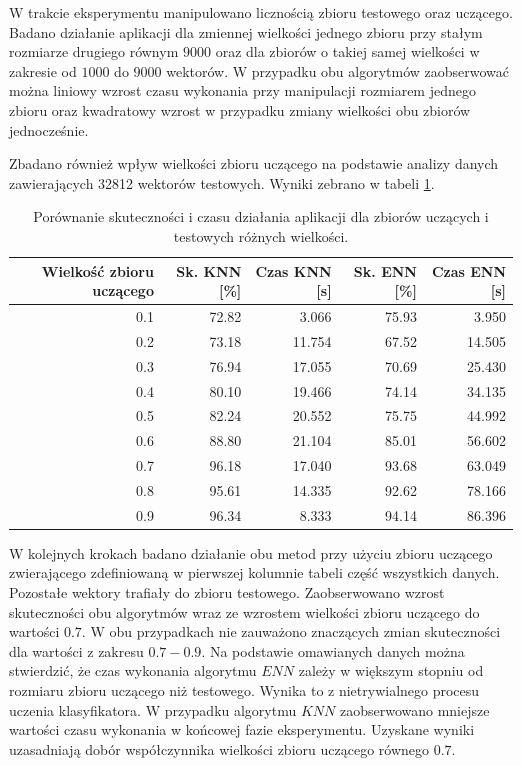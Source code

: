 W trakcie eksperymentu manipulowano licznością zbioru testowego oraz uczącego. Badano działanie aplikacji dla zmiennej wielkości jednego zbioru przy stałym rozmiarze drugiego równym $9000$ oraz dla zbiorów o takiej samej wielkości w zakresie od $1000$ do $9000$ wektorów. W przypadku obu algorytmów zaobserwować można liniowy wzrost czasu wykonania przy manipulacji rozmiarem jednego zbioru oraz kwadratowy wzrost w przypadku zmiany wielkości obu zbiorów jednocześnie.

Zbadano również wpływ wielkości zbioru uczącego na podstawie analizy danych zawierających 32812 wektorów testowych. Wyniki zebrano w tabeli \ref{tab:rozmiar-zbioru-uczacego}.

\begin{table}[H]
	\centering
	\begin{tabular}{|r|r|r|r|r|}
		\hline
		Wielkość zbioru uczącego & Sk. KNN [\%] & Czas KNN [s] & Sk. ENN [\%] & Czas ENN [s]  \\ 
		\hline
		0.1 & 72.82 & 3.066 & 75.93 & 3.950\\
		\hline
		0.2 & 73.18 & 11.754 & 67.52 & 14.505 \\
		\hline
		0.3 & 76.94 & 17.055 & 70.69 & 25.430 \\
		\hline
		0.4 & 80.10 & 19.466 & 74.14 & 34.135 \\
		\hline
		0.5 & 82.24 & 20.552 & 75.75 &  44.992\\
		\hline
		0.6 & 88.80 & 21.104 & 85.01 & 56.602 \\
		\hline
		0.7 & 96.18 & 17.040 & 93.68 & 63.049 \\
		\hline
		0.8 & 95.61 & 14.335 & 92.62 & 78.166 \\
		\hline
		0.9 & 96.34 & 8.333 & 94.14 & 86.396 \\
		\hline
	\end{tabular}
	\caption{Porównanie skuteczności i czasu działania aplikacji dla zbiorów uczących i testowych różnych wielkości.}
	\label{tab:rozmiar-zbioru-uczacego}	
\end{table}
W kolejnych krokach badano działanie obu metod przy użyciu zbioru uczącego zwierającego zdefiniowaną w pierwszej kolumnie tabeli część wszystkich danych. Pozostałe wektory trafiały do zbioru testowego. Zaobserwowano wzrost skuteczności obu algorytmów wraz ze wzrostem wielkości zbioru uczącego do wartości $0.7$. W obu przypadkach nie zauważono znaczących zmian skuteczności dla wartości z zakresu $0.7-0.9$. Na podstawie omawianych danych można stwierdzić, że czas wykonania algorytmu $ENN$ zależy w większym stopniu od rozmiaru zbioru uczącego niż testowego. Wynika to z nietrywialnego procesu uczenia klasyfikatora. W przypadku algorytmu $KNN$ zaobserwowano mniejsze wartości czasu wykonania w końcowej fazie eksperymentu.
Uzyskane wyniki uzasadniają dobór współczynnika wielkości zbioru uczącego równego $0.7$.

